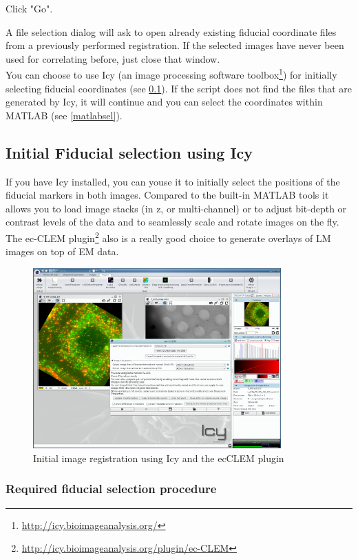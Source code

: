 \documentclass[10pt,a4paper,onepage,DIV12]{scrartcl}
\begin{document}
Click "Go".

A file selection dialog will ask to open already existing fiducial coordinate files from a previously performed registration. If the selected images have never been used for correlating before, just close that window.\\

You can choose to use Icy (an image processing software toolbox\footnote{\url{http://icy.bioimageanalysis.org/}}) for initially selecting fiducial coordinates (see \ref{icysel}). If the script does not find the files that are generated by Icy, it will continue and you can select the coordinates within MATLAB (see \ref{matlabsel}).

\subsection{Initial Fiducial selection using Icy}
\label{icysel}
If you have Icy installed, you can youse it to initially select the positions of the fiducial markers in both images. Compared to the built-in MATLAB tools it allows you to load image stacks (in z, or multi-channel) or to adjust bit-depth or contrast levels of the data and to seamlessly scale and rotate images on the fly. The ec-CLEM plugin\footnote{\url{http://icy.bioimageanalysis.org/plugin/ec-CLEM}} also is a really good choice to generate overlays of LM images on top of EM data.

\begin{figure}
 \centering
 \includegraphics[width=0.85\textwidth]{images/icy}
 \caption{Initial image registration using Icy and the ecCLEM plugin}
 \label{fig:icy}
\end{figure}

\subsubsection{Required fiducial selection procedure}
\end{document}
